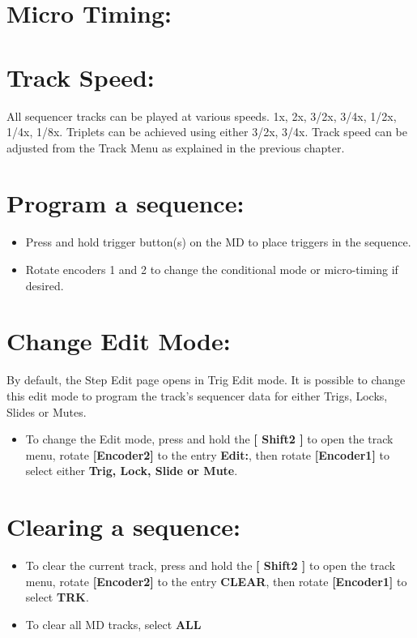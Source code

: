\section{Micro Timing:}

\vspace{-0.3cm}

\section{Track Speed:}
All sequencer tracks can be played at various speeds. 1x, 2x, 3/2x, 3/4x, 1/2x, 1/4x, 1/8x. Triplets can be achieved using either 3/2x, 3/4x. 
Track speed can be adjusted from the Track Menu as explained in the previous chapter.

\section{Program a sequence:}
\begin{itemize}
\item Press and hold trigger button(s) on the MD to place triggers in the sequence.
\item Rotate encoders 1 and 2 to change the conditional mode or micro-timing if desired.
\end{itemize}

\section{Change Edit Mode:}
By default, the Step Edit page opens in Trig Edit mode. It is possible to change this edit mode to program the track's sequencer data for either Trigs, Locks, Slides or Mutes.
\begin{itemize}
\item To change the Edit mode, press and hold the\textbf{ [ Shift2 ]} to open the track menu, rotate \textbf{[Encoder2]} to the entry \textbf{Edit:}, then rotate \textbf{[Encoder1]} to select either \textbf{Trig, Lock, Slide or Mute}.
\end{itemize}
\vspace{-0.3cm}

\section{Clearing a sequence:}
\begin{itemize}
\item To clear the current track, press and hold the\textbf{ [ Shift2 ]} to open the track menu, rotate \textbf{[Encoder2]} to the entry \textbf{CLEAR}, then rotate \textbf{[Encoder1]} to select \textbf{TRK}.
\item To clear all MD tracks, select \textbf{ALL}
\end{itemize}

